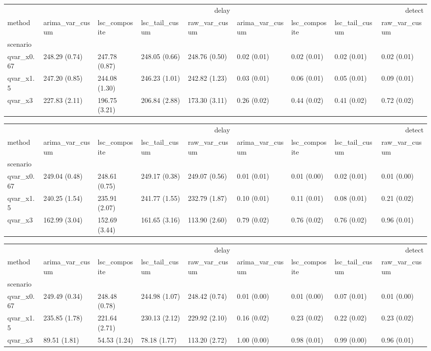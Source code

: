 \begin{tabular}{lllllllll}
\toprule
 & \multicolumn{4}{r}{delay} & \multicolumn{4}{r}{detect} \\
method & arima_var_cusum & lsc_composite & lsc_tail_cusum & raw_var_cusum & arima_var_cusum & lsc_composite & lsc_tail_cusum & raw_var_cusum \\
scenario &  &  &  &  &  &  &  &  \\
\midrule
qvar_x0.67 & 248.29 (0.74) & 247.78 (0.87) & 248.05 (0.66) & 248.76 (0.50) & 0.02 (0.01) & 0.02 (0.01) & 0.02 (0.01) & 0.02 (0.01) \\
qvar_x1.5 & 247.20 (0.85) & 244.08 (1.30) & 246.23 (1.01) & 242.82 (1.23) & 0.03 (0.01) & 0.06 (0.01) & 0.05 (0.01) & 0.09 (0.01) \\
qvar_x3 & 227.83 (2.11) & 196.75 (3.21) & 206.84 (2.88) & 173.30 (3.11) & 0.26 (0.02) & 0.44 (0.02) & 0.41 (0.02) & 0.72 (0.02) \\
\bottomrule
\end{tabular}

\begin{tabular}{lllllllll}
\toprule
 & \multicolumn{4}{r}{delay} & \multicolumn{4}{r}{detect} \\
method & arima_var_cusum & lsc_composite & lsc_tail_cusum & raw_var_cusum & arima_var_cusum & lsc_composite & lsc_tail_cusum & raw_var_cusum \\
scenario &  &  &  &  &  &  &  &  \\
\midrule
qvar_x0.67 & 249.04 (0.48) & 248.61 (0.75) & 249.17 (0.38) & 249.07 (0.56) & 0.01 (0.01) & 0.01 (0.00) & 0.02 (0.01) & 0.01 (0.00) \\
qvar_x1.5 & 240.25 (1.54) & 235.91 (2.07) & 241.77 (1.55) & 232.79 (1.87) & 0.10 (0.01) & 0.11 (0.01) & 0.08 (0.01) & 0.21 (0.02) \\
qvar_x3 & 162.99 (3.04) & 152.69 (3.44) & 161.65 (3.16) & 113.90 (2.60) & 0.79 (0.02) & 0.76 (0.02) & 0.76 (0.02) & 0.96 (0.01) \\
\bottomrule
\end{tabular}

\begin{tabular}{lllllllll}
\toprule
 & \multicolumn{4}{r}{delay} & \multicolumn{4}{r}{detect} \\
method & arima_var_cusum & lsc_composite & lsc_tail_cusum & raw_var_cusum & arima_var_cusum & lsc_composite & lsc_tail_cusum & raw_var_cusum \\
scenario &  &  &  &  &  &  &  &  \\
\midrule
qvar_x0.67 & 249.49 (0.34) & 248.48 (0.78) & 244.98 (1.07) & 248.42 (0.74) & 0.01 (0.00) & 0.01 (0.00) & 0.07 (0.01) & 0.01 (0.00) \\
qvar_x1.5 & 235.85 (1.78) & 221.64 (2.71) & 230.13 (2.12) & 229.92 (2.10) & 0.16 (0.02) & 0.23 (0.02) & 0.22 (0.02) & 0.23 (0.02) \\
qvar_x3 & 89.51 (1.81) & 54.53 (1.24) & 78.18 (1.77) & 113.20 (2.72) & 1.00 (0.00) & 0.98 (0.01) & 0.99 (0.00) & 0.96 (0.01) \\
\bottomrule
\end{tabular}

